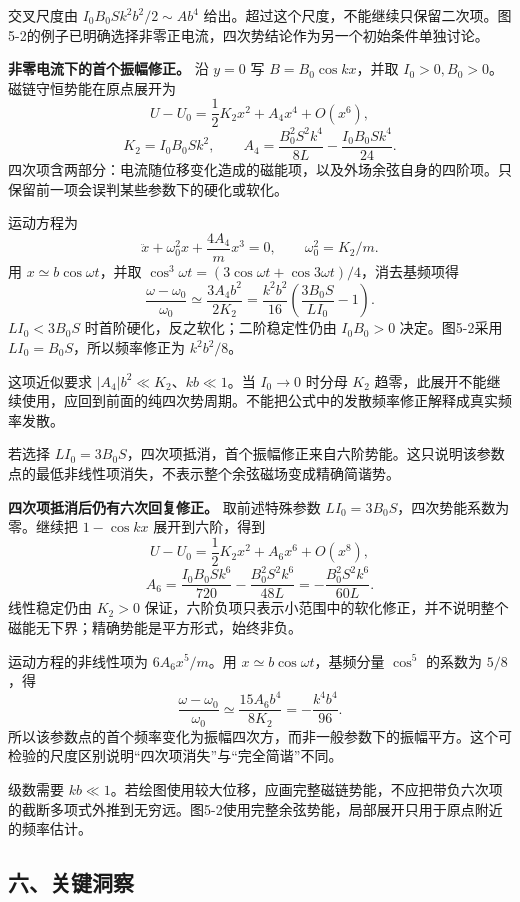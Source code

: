 \documentclass[12pt,a4paper,UTF8]{ctexart}
\begin{document}
交叉尺度由 \(I_0B_0Sk^2b^2/2\sim Ab^4\)
给出。超过这个尺度，不能继续只保留二次项。图5-2的例子已明确选择非零正电流，四次势结论作为另一个初始条件单独讨论。

\textbf{非零电流下的首个振幅修正。} 沿 \(y=0\) 写 \(B=B_0\cos kx\)，并取
\(I_0>0,B_0>0\)。磁链守恒势能在原点展开为 \[
U-U_0=\frac12K_2x^2+A_4x^4+O(x^6),
\] \[
K_2=I_0B_0Sk^2,
\qquad A_4=\frac{B_0^2S^2k^4}{8L}-\frac{I_0B_0Sk^4}{24}.
\]
四次项含两部分：电流随位移变化造成的磁能项，以及外场余弦自身的四阶项。只保留前一项会误判某些参数下的硬化或软化。

运动方程为 \[
\ddot x+\omega_0^2x+\frac{4A_4}{m}x^3=0,
\qquad\omega_0^2=K_2/m.
\] 用 \(x\simeq b\cos\omega t\)，并取
\(\cos^3\omega t=(3\cos\omega t+\cos3\omega t)/4\)，消去基频项得 \[
\frac{\omega-\omega_0}{\omega_0}
\simeq\frac{3A_4b^2}{2K_2}
=\frac{k^2b^2}{16}\left(\frac{3B_0S}{LI_0}-1\right).
\] \(LI_0<3B_0S\) 时首阶硬化，反之软化；二阶稳定性仍由 \(I_0B_0>0\)
决定。图5-2采用 \(LI_0=B_0S\)，所以频率修正为 \(k^2b^2/8\)。

这项近似要求 \(|A_4|b^2\ll K_2\)、\(kb\ll1\)。当 \(I_0\to0\) 时分母
\(K_2\)
趋零，此展开不能继续使用，应回到前面的纯四次势周期。不能把公式中的发散频率修正解释成真实频率发散。

若选择
\(LI_0=3B_0S\)，四次项抵消，首个振幅修正来自六阶势能。这只说明该参数点的最低非线性项消失，不表示整个余弦磁场变成精确简谐势。

\textbf{四次项抵消后仍有六次回复修正。} 取前述特殊参数
\(LI_0=3B_0S\)，四次势能系数为零。继续把 \(1-\cos kx\) 展开到六阶，得到
\[
U-U_0=\frac12K_2x^2+A_6x^6+O(x^8),
\] \[
A_6=\frac{I_0B_0Sk^6}{720}-\frac{B_0^2S^2k^6}{48L}
=-\frac{B_0^2S^2k^6}{60L}.
\] 线性稳定仍由 \(K_2>0\)
保证，六阶负项只表示小范围中的软化修正，并不说明整个磁能无下界；精确势能是平方形式，始终非负。

运动方程的非线性项为 \(6A_6x^5/m\)。用
\(x\simeq b\cos\omega t\)，基频分量 \(\cos^5\) 的系数为 \(5/8\)，得 \[
\frac{\omega-\omega_0}{\omega_0}
\simeq\frac{15A_6b^4}{8K_2}
=-\frac{k^4b^4}{96}.
\]
所以该参数点的首个频率变化为振幅四次方，而非一般参数下的振幅平方。这个可检验的尺度区别说明``四次项消失''与``完全简谐''不同。

级数需要
\(kb\ll1\)。若绘图使用较大位移，应画完整磁链势能，不应把带负六次项的截断多项式外推到无穷远。图5-2使用完整余弦势能，局部展开只用于原点附近的频率估计。

\subsection{六、关键洞察}\label{ux516dux5173ux952eux6d1eux5bdf-4}
\end{document}
